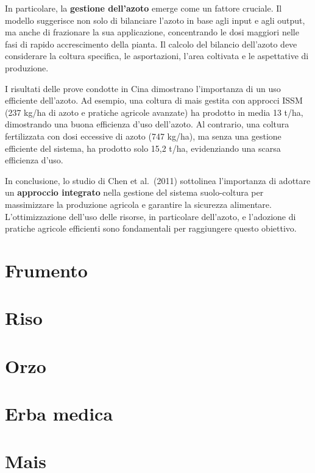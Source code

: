 \documentclass[
]{book}
\theoremstyle{definition}
\theoremstyle{definition}
\theoremstyle{definition}
\theoremstyle{definition}
\theoremstyle{remark}
\begin{document}
In particolare, la \textbf{gestione dell'azoto} emerge come un fattore cruciale. Il modello suggerisce non solo di bilanciare l'azoto in base agli input e agli output, ma anche di frazionare la sua applicazione, concentrando le dosi maggiori nelle fasi di rapido accrescimento della pianta. Il calcolo del bilancio dell'azoto deve considerare la coltura specifica, le asportazioni, l'area coltivata e le aspettative di produzione.

I risultati delle prove condotte in Cina dimostrano l'importanza di un uso efficiente dell'azoto. Ad esempio, una coltura di mais gestita con approcci ISSM (237 kg/ha di azoto e pratiche agricole avanzate) ha prodotto in media 13 t/ha, dimostrando una buona efficienza d'uso dell'azoto. Al contrario, una coltura fertilizzata con dosi eccessive di azoto (747 kg/ha), ma senza una gestione efficiente del sistema, ha prodotto solo 15,2 t/ha, evidenziando una scarsa efficienza d'uso.

In conclusione, lo studio di Chen et al.~(2011) sottolinea l'importanza di adottare un \textbf{approccio integrato} nella gestione del sistema suolo-coltura per massimizzare la produzione agricola e garantire la sicurezza alimentare. L'ottimizzazione dell'uso delle risorse, in particolare dell'azoto, e l'adozione di pratiche agricole efficienti sono fondamentali per raggiungere questo obiettivo.

\hypertarget{frumento}{%
\section{Frumento}\label{frumento}}

\hypertarget{riso}{%
\section{Riso}\label{riso}}

\hypertarget{orzo}{%
\section{Orzo}\label{orzo}}

\hypertarget{erba-medica}{%
\section{Erba medica}\label{erba-medica}}

\hypertarget{mais}{%
\section{Mais}\label{mais}}
\end{document}
